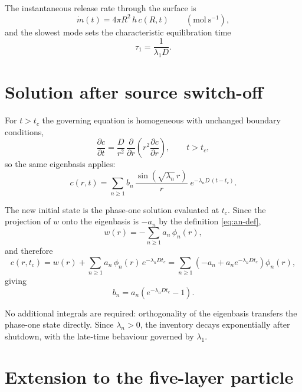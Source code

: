 \documentclass[11pt,a4paper]{article}
\begin{document}
The instantaneous release rate through the surface is
\begin{equation}
\dot{m}(t) = 4\pi R^{2}\, h\, c(R,t)
\qquad \left(\mathrm{mol\ s^{-1}}\right) ,
\end{equation}
and the slowest mode sets the characteristic equilibration time
\begin{equation}
\tau_{1} = \frac{1}{\lambda_{1} D} .
\end{equation}

\section{Solution after source switch-off}

For $t > t_{c}$ the governing equation is homogeneous with unchanged boundary
conditions,
\begin{equation}
\frac{\partial c}{\partial t}
= \frac{D}{r^{2}}\,\frac{\partial}{\partial r}\!\left(r^{2}\frac{\partial c}{\partial r}\right) ,
\qquad t > t_{c} ,
\end{equation}
so the same eigenbasis applies:
\begin{equation}
c(r,t) = \sum_{n \ge 1} b_{n}\,
\frac{\sin\!\left(\sqrt{\lambda_{n}}\,r\right)}{r}\;
e^{-\lambda_{n} D\,(t - t_{c})} .
\end{equation}

The new initial state is the phase-one solution evaluated at $t_{c}$. Since the
projection of $w$ onto the eigenbasis is $-a_{n}$ by the definition
\eqref{eq:an-def},
\begin{equation}
w(r) = -\sum_{n \ge 1} a_{n}\,\phi_{n}(r) ,
\end{equation}
and therefore
\begin{equation}
c(r,t_{c})
= w(r) + \sum_{n \ge 1} a_{n}\,\phi_{n}(r)\, e^{-\lambda_{n} D t_{c}}
= \sum_{n \ge 1}\left(-a_{n} + a_{n} e^{-\lambda_{n} D t_{c}}\right)\phi_{n}(r) ,
\end{equation}
giving
\begin{equation}
\boxed{\;
b_{n} = a_{n}\left(e^{-\lambda_{n} D t_{c}} - 1\right) .
\;}
\label{eq:bn}
\end{equation}

No additional integrals are required: orthogonality of the eigenbasis transfers the
phase-one state directly. Since $\lambda_{n} > 0$, the inventory decays
exponentially after shutdown, with the late-time behaviour governed by
$\lambda_{1}$.

\section{Extension to the five-layer particle}
\end{document}
